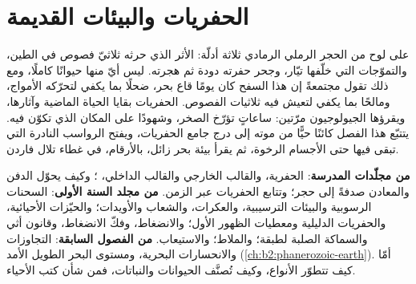 \chapter{الحفريات والبيئات القديمة}\label{ch:b2:palaeoenvironments}

على لوح من الحجر الرملي الرمادي ثلاثة أدلّة: الأثر الذي حرثه ثلاثيّ فصوص في الطين،
والتموّجات التي خلّفها تيّار، وجحر حفرته دودة ثم هجرته. ليس أيّ منها حيوانًا كاملًا،
ومع ذلك تقول مجتمعةً إن هذا السفح كان يومًا قاع بحر، ضحلًا بما يكفي لتحرّكه الأمواج،
ومالحًا بما يكفي لتعيش فيه ثلاثيات الفصوص. الحفريات بقايا الحياة الماضية وآثارها،
ويقرؤها الجيولوجيون مرّتين: ساعاتٍ تؤرّخ الصخر، وشهودًا على المكان الذي تكوّن فيه.
يتتبّع هذا الفصل كائنًا حيًّا من موته إلى درج جامع الحفريات، ويفتح الرواسب النادرة
التي تبقى فيها حتى الأجسام الرخوة، ثم يقرأ بيئة بحر زائل، بالأرقام، في غطاء تلال
فاردن.

\begin{recall}
\textbf{من مجلّدات المدرسة}: الحفرية، والقالب الخارجي والقالب الداخلي، ؛ وكيف
يحوّل الدفن والمعادن صدفةً إلى حجر؛ وتتابع الحفريات عبر الزمن. \textbf{من مجلد السنة الأولى}:
السحنات الرسوبية والبيئات الترسيبية، والعكرات، والشعاب والأويدات؛ والحيّزات الأحيائية، والحفريات
الدليلية ومعطيات الظهور الأول؛ والانضغاط، وفكّ الانضغاط، وقانون أثي والسماكة الصلبة
لطبقة؛ والملاط؛ والاستيعاب. \textbf{من الفصول السابقة}: التجاوزات والانحسارات البحرية،
ومستوى البحر الطويل الأمد  (\cref{ch:b2:phanerozoic-earth}). أمّا كيف
تتطوّر الأنواع، وكيف تُصنَّف الحيوانات والنباتات، فمن شأن كتب الأحياء.
\end{recall}

